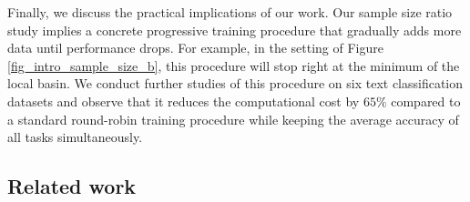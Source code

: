 Finally, we discuss the practical implications of our work.
Our sample size ratio study implies a concrete progressive training procedure that gradually adds more data until performance drops.
For example, in the setting of Figure \ref{fig_intro_sample_size_b}, this procedure will stop right at the minimum of the local basin.
We conduct further studies of this procedure on six text classification datasets and observe that it reduces the computational cost by $65\%$ compared to a standard round-robin training procedure while keeping the average accuracy of all tasks simultaneously.




\subsection{Related work}

